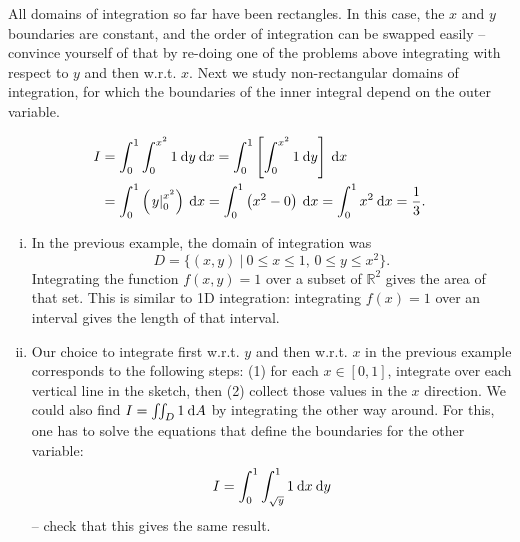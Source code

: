 \begin{remark}
All domains of integration so far have been rectangles. In this case, the $x$ and $y$ boundaries are constant, and the order of integration can be swapped easily -- convince yourself of that by re-doing one of the problems above integrating with respect to $y$ and then w.r.t. $x$. Next we study non-rectangular domains of integration, for which the boundaries of the inner integral depend on the outer variable.
\end{remark}

\begin{example}
\label{expl:non-rect}
\begin{equation*}
\begin{split}
I & = \int_{0}^{1} \int_{0}^{x^2} 1 \: \mathrm{d} y \: \mathrm{d} x 
= \int_{0}^{1} \left[\int_{0}^{x^2} 1 \: \mathrm{d} y\right] \: \mathrm{d} x \\
& = \int_{0}^{1} \left(\left.y\right|_{0}^{x^2}\right) \: \mathrm{d} x 
= \int_{0}^{1} \left(x^2-0\right) \: \mathrm{d} x = \int_{0}^{1} x^2 \: \mathrm{d} x = \frac13.
\end{split}
\end{equation*}
\end{example}

\begin{remark}
\begin{enumerate}[(i)]
	\item In the previous example, the domain of integration was
	\[ D = \{ (x,y) \: | \: 0 \leq x \leq 1,\, 0 \leq y \leq x^2 \}. \]
	Integrating the function $f(x,y)=1$ over a subset of $\mathbb{R}^2$ gives the area of that set. This is similar to 1D integration: integrating $f(x)=1$ over an interval gives the length of that interval.
	\item Our choice to integrate first w.r.t. $y$ and then w.r.t. $x$ in the previous example corresponds to the following steps: (1) for each $x\in[0,1]$, integrate over each vertical line in the sketch, then (2) collect those values in the $x$ direction. 
	We could also find $I=\iint_D 1 \: \mathrm{d} A$ by integrating the other way around. For this, one has to solve the equations that define the boundaries for the other variable:
	\[ I = \int_{0}^{1} \int_{\sqrt{y}}^{1} 1 \: \mathrm{d} x \: \mathrm{d} y \]
	-- check that this gives the same result.
\end{enumerate}
\end{remark}

